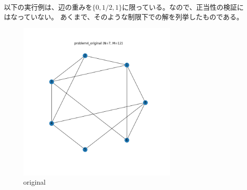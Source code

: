 \documentclass[a4paper, 10pt, dvipdfmx]{jlreq}
\begin{document}
以下の実行例は、辺の重みを$\{0,1/2,1\}$に限っている。なので、正当性の検証にはなっていない。
あくまで、そのような制限下での解を列挙したものである。

\begin{figure}[htbp]
  \begin{center}
    \includegraphics[height=80mm]{./img_5/problem4_original.png}
    \caption{original}
  \end{center}
\end{figure}
\end{document}
